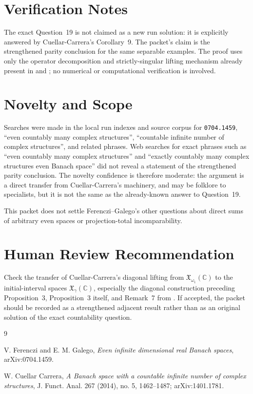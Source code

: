\documentclass[11pt]{article}
\newcommand{\C}{\mathbb C}
\newcommand{\X}{\mathfrak X}
\begin{document}
\section*{Verification Notes}

The exact Question~19 is not claimed as a new run solution: it is
explicitly answered by Cuellar-Carrera's Corollary~9.  The packet's
claim is the strengthened parity conclusion for the same separable
examples.  The proof uses only the operator decomposition and
strictly-singular lifting mechanism already present in \cite{CC} and
\cite{FG}; no numerical or computational verification is involved.

\section*{Novelty and Scope}

Searches were made in the local run indexes and source corpus for
\texttt{0704.1459}, ``even countably many complex structures'',
``countable infinite number of complex structures'', and related
phrases.  Web searches for exact phrases such as ``even countably many
complex structures'' and ``exactly countably many complex structures
even Banach space'' did not reveal a statement of the strengthened
parity conclusion.  The novelty confidence is therefore moderate: the
argument is a direct transfer from Cuellar-Carrera's machinery, and may
be folklore to specialists, but it is not the same as the already-known
answer to Question~19.

This packet does not settle Ferenczi--Galego's other questions about
direct sums of arbitrary even spaces or projection-total incomparability.

\section*{Human Review Recommendation}

Check the transfer of Cuellar-Carrera's diagonal lifting from
$\X_{\omega_1}(\C)$ to the initial-interval spaces $\X_\gamma(\C)$,
especially the diagonal construction preceding Proposition~3,
Proposition~3 itself, and Remark~7 from \cite{CC}.  If accepted, the
packet should be recorded as a strengthened adjacent result rather than
as an original solution of the exact countability question.

\begin{thebibliography}{9}

V. Ferenczi and E. M. Galego,
\emph{Even infinite dimensional real Banach spaces},
arXiv:0704.1459.

W. Cuellar Carrera,
\emph{A Banach space with a countable infinite number of complex structures},
J. Funct. Anal. 267 (2014), no. 5, 1462--1487;
arXiv:1401.1781.

\end{thebibliography}
\end{document}
